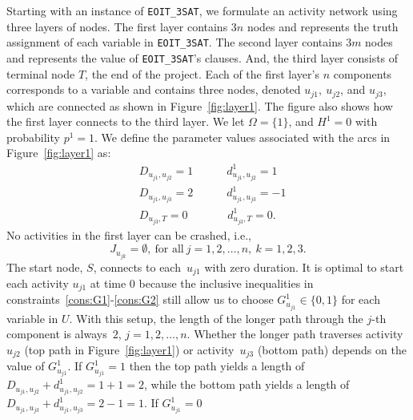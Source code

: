 \documentclass[11pt]{article}
\newcommand{\tcr}{\textcolor{red}}
\begin{document}
	Starting with an instance of \verb|EOIT_3SAT|, we formulate an activity network using three layers of nodes. The first layer contains \(3n\) nodes and represents the truth assignment of each variable in \verb|EOIT_3SAT|. The second layer contains \(3m\) nodes and represents the value of \verb|EOIT_3SAT|'s clauses. And, the third layer consists of terminal node \(T\), the end of the project. Each of the first layer's \(n\) components corresponds to a variable and contains three nodes, denoted \(u_{j1},\ u_{j2}\), and \(u_{j3}\), which are connected as shown in Figure~\ref{fig:layer1}. The figure also shows how the first layer connects to the third layer. We let \(\Omega = \{1\}\), and \(H^1 = 0\) with probability \(p^1 = 1\). We define the parameter values associated with the arcs in Figure~\ref{fig:layer1} as:
    \begin{subequations}\label{eqn:first_layer}
    	\begin{align}
    	& D_{u_{j1},u_{j2}} = 1 \qquad \quad d^1_{u_{j1},u_{j2}} = 1\\
    	& D_{u_{j1},u_{j3}} = 2 \qquad \quad d^1_{u_{j1},u_{j3}} = -1  \\
    	& D_{u_{j3},T} = 0 \qquad \quad \;\; d^1_{u_{j3},T} = 0.
    	\end{align}
    \end{subequations}
	No activities in the first layer can be crashed, i.e., 
    \begin{equation}\label{eqn:first_layer_crash}	
    	J_{u_{jk}} = \emptyset, \ \mbox{for all} \  j = 1,2,\dots, n,\ k = 1,2,3.
    \end{equation}	
	The start node, $S$, connects to each~$u_{j1}$ with zero duration. It is optimal to start each activity \(u_{j1}\) at time \(0\) because the inclusive inequalities in constraints~\eqref{cons:G1}-\eqref{cons:G2} still allow us to choose \(G^1_{u_{j1}}  \in \{0,1\}\) for each variable in $U$. With this setup, the length of the longer path through the \(j\)-th component is always~\(2\), \(j = 1,2,\dots,n\). Whether the longer path traverses activity~\(u_{j2}\) (top path in Figure~\ref{fig:layer1}) or activity~\(u_{j3}\) (bottom path) depends on the value of \(G^1_{u_{j1}}\). 
	If \(G^1_{u_{j1}} = 1\) then the top path yields a length of \(D_{u_{j1},u_{j2}} + d^1_{u_{j1},u_{j2}} = 1 + 1 = 2\), while the bottom path yields a length of \(D_{u_{j1},u_{j3}} + d^1_{u_{j1},u_{j3}} = 2 - 1 = 1\). If \(G^1_{u_{j1}} = 0\) 
\end{document}
